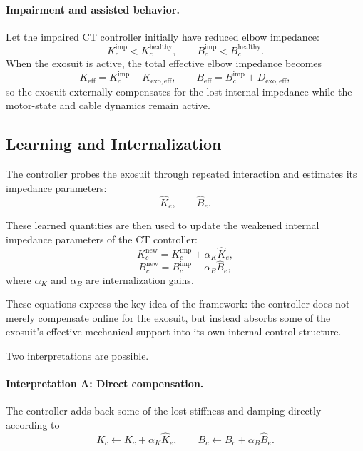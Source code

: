 \documentclass[11pt]{article}
\begin{document}
\paragraph{Impairment and assisted behavior.}
Let the impaired CT controller initially have reduced elbow impedance:
\begin{equation}
    K_c^{\mathrm{imp}} < K_c^{\mathrm{healthy}}, \qquad
    B_c^{\mathrm{imp}} < B_c^{\mathrm{healthy}}.
\end{equation}
When the exosuit is active, the total effective elbow impedance becomes
\begin{equation}
    K_{\mathrm{eff}} = K_c^{\mathrm{imp}} + K_{\mathrm{exo,eff}},\qquad
    B_{\mathrm{eff}} = B_c^{\mathrm{imp}} + D_{\mathrm{exo,eff}},
\end{equation}
so the exosuit externally compensates for the lost internal impedance while the motor-state and cable dynamics remain active.

\subsection{Learning and Internalization}

The controller probes the exosuit through repeated interaction and estimates its impedance parameters:
\begin{equation}
\hat{K}_e, \qquad \hat{B}_e.
\end{equation}

These learned quantities are then used to update the weakened internal impedance parameters of the CT controller:
\begin{equation}
K_c^{\mathrm{new}} = K_c^{\mathrm{imp}} + \alpha_K \hat{K}_e,
\end{equation}
\begin{equation}
B_c^{\mathrm{new}} = B_c^{\mathrm{imp}} + \alpha_B \hat{B}_e,
\end{equation}
where \(\alpha_K\) and \(\alpha_B\) are internalization gains.

These equations express the key idea of the framework: the controller does not merely compensate online for the exosuit, but instead absorbs some of the exosuit's effective mechanical support into its own internal control structure.

Two interpretations are possible.

\paragraph{Interpretation A: Direct compensation.}
The controller adds back some of the lost stiffness and damping directly according to
\begin{equation}
K_c \leftarrow K_c + \alpha_K \hat{K}_e,
\qquad
B_c \leftarrow B_c + \alpha_B \hat{B}_e.
\end{equation}
\end{document}
